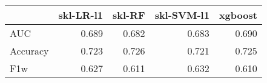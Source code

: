 \begin{tabular}{lrrrr}
\toprule
{} &  skl-LR-l1 &  skl-RF &  skl-SVM-l1 &  xgboost \\
\midrule
AUC      &      0.689 &   0.682 &       0.683 &    0.690 \\
Accuracy &      0.723 &   0.726 &       0.721 &    0.725 \\
F1w      &      0.627 &   0.611 &       0.632 &    0.610 \\
\bottomrule
\end{tabular}
